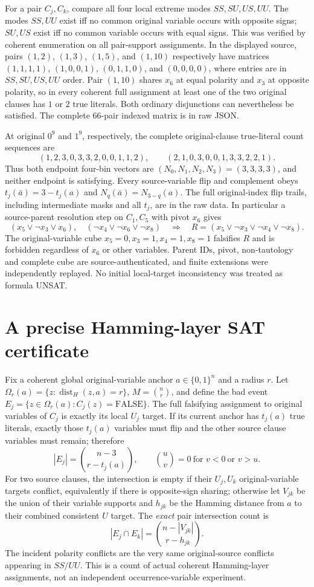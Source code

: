 \documentclass[11pt]{article}
\newcommand{\bin}[2]{\binom{#1}{#2}}
\begin{document}
For a pair $C_j,C_k$, compare all four local extreme modes $SS,SU,US,UU$. The modes $SS,UU$ exist iff no common original variable occurs with opposite signs; $SU,US$ exist iff no common variable occurs with equal signs. This was verified by coherent enumeration on all pair-support assignments. In the displayed source, pairs $(1,2)$, $(1,3)$, $(1,5)$, and $(1,10)$ respectively have matrices $(1,1,1,1)$, $(1,0,0,1)$, $(0,1,1,0)$, and $(0,0,0,0)$, where entries are in $SS,SU,US,UU$ order. Pair $(1,10)$ shares $x_6$ at equal polarity and $x_3$ at opposite polarity, so in every coherent full assignment at least one of the two original clauses has $1$ or $2$ true literals. Both ordinary disjunctions can nevertheless be satisfied. The complete 66-pair indexed matrix is in raw JSON.

At original $0^9$ and $1^9$, respectively, the complete original-clause true-literal count sequences are
\[
(1,2,3,0,3,3,2,0,0,1,1,2),\qquad
(2,1,0,3,0,0,1,3,3,2,2,1).
\]
Thus both endpoint four-bin vectors are $(N_0,N_1,N_2,N_3)=(3,3,3,3)$, and neither endpoint is satisfying. Every source-variable flip and complement obeys $t_j(\bar a)=3-t_j(a)$ and $N_q(\bar a)=N_{3-q}(a)$. The full original-index flip trails, including intermediate masks and all $t_j$, are in the raw data. In particular a source-parent resolution step on $C_1,C_5$ with pivot $x_6$ gives
\[
(x_5\vee\neg x_3\vee x_6),\quad(\neg x_4\vee\neg x_6\vee\neg x_8)
\quad\Rightarrow\quad
R=(x_5\vee\neg x_3\vee\neg x_4\vee\neg x_8).
\]
The original-variable cube $x_5=0,x_3=1,x_4=1,x_8=1$ falsifies $R$ and is forbidden regardless of $x_6$ or other variables. Parent IDs, pivot, non-tautology and complete cube are source-authenticated, and finite extensions were independently replayed. No initial local-target inconsistency was treated as formula UNSAT.

\section{A precise Hamming-layer SAT certificate}
Fix a coherent global original-variable anchor $a\in\{0,1\}^n$ and a radius $r$. Let $\Omega_r(a)=\{z:\operatorname{dist}_H(z,a)=r\}$, $M=\bin nr$, and define the bad event $E_j=\{z\in\Omega_r(a):C_j(z)=\mathrm{FALSE}\}$. The full falsifying assignment to original variables of $C_j$ is exactly its local $U_j$ target. If its current anchor has $t_j(a)$ true literals, exactly those $t_j(a)$ variables must flip and the other source clause variables must remain; therefore
\[
|E_j|=\binom{n-3}{r-t_j(a)},\qquad \binom{u}{v}=0\ \text{for }v<0\ \text{or }v>u.
\]
For two source clauses, the intersection is empty if their $U_j,U_k$ original-variable targets conflict, equivalently if there is opposite-sign sharing; otherwise let $V_{jk}$ be the union of their variable supports and $h_{jk}$ be the Hamming distance from $a$ to their combined consistent $U$ target. The \emph{exact} pair intersection count is
\[
|E_j\cap E_k|=\binom{n-|V_{jk}|}{r-h_{jk}}.
\]
The incident polarity conflicts are the very same original-source conflicts appearing in $SS/UU$. This is a count of actual coherent Hamming-layer assignments, not an independent occurrence-variable experiment.
\end{document}
